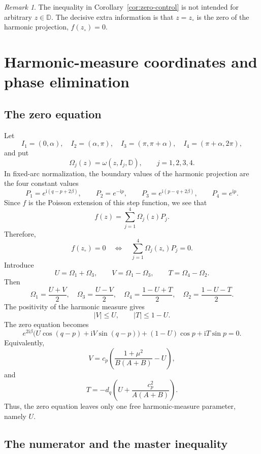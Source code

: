 \documentclass[11pt]{amsart}
\theoremstyle{remark}
\newtheorem{remark}[theorem]{Remark}
\newcommand{\D}{\mathbb D}
\newcommand{\ii}{\mathrm i}
\newcommand{\zc}{z_\circ}
\numberwithin{equation}{section}
\begin{document}
\begin{remark}
The inequality in Corollary~\ref{cor:zero-control} is not intended for arbitrary $z\in\D$.  The decisive extra information is that $z=\zc$ is the zero of the harmonic projection, $f(\zc)=0$.
\end{remark}

\section{Harmonic-measure coordinates and phase elimination}\label{sec:harmonic}

\subsection{The zero equation}

Let
\[
        I_1=(0,\alpha),\quad
        I_2=(\alpha,\pi),\quad
        I_3=(\pi,\pi+\alpha),\quad
        I_4=(\pi+\alpha,2\pi),
\]
and put
\[
        \Omega_j(z)=\omega(z,I_j,\D),
        \qquad j=1,2,3,4.
\]
In fixed-arc normalization, the boundary values of the harmonic projection are the four constant values
\[
        P_1=e^{\ii(q-p+2\beta)},
        \qquad
        P_2=e^{-\ii p},
        \qquad
        P_3=e^{\ii(p-q+2\beta)},
        \qquad
        P_4=e^{\ii p}.
\]
Since $f$ is the Poisson extension of this step function, we see that
\[
        f(z)=\sum_{j=1}^4 \Omega_j(z)P_j.
\]
Therefore,
\[
        f(\zc)=0
        \quad\Longleftrightarrow\quad
        \sum_{j=1}^4 \Omega_j(\zc)P_j=0.
\]
Introduce
\[
        U=\Omega_1+
        \Omega_3,
        \qquad
        V=\Omega_1-
        \Omega_3,
        \qquad
        T=\Omega_4-
        \Omega_2.
\]
Then
\[
        \Omega_1=\frac{U+V}{2},\quad
        \Omega_3=\frac{U-V}{2},\quad
        \Omega_4=\frac{1-U+T}{2},\quad
        \Omega_2=\frac{1-U-T}{2}.
\]
The positivity of the harmonic measure gives
\[
        |V|\leq U,
        \qquad
        |T|\leq 1-U.
\]
The zero equation becomes
\[
        e^{2\ii\beta}\bigl(U\cos(q-p)+\ii V\sin(q-p)\bigr)
        +(1-U)\cos p+
        \ii T\sin p=0.
\]
Equivalently,
\[
        V=c_p\left(\frac{1+\mu^2}{B(A+B)}-U\right),
\]
and
\[
        T=-d_q\left(U+\frac{c_p^2}{A(A+B)}\right).
\]
Thus, the zero equation leaves only one free harmonic-measure parameter, namely $U$.

\subsection{The numerator and the master inequality}
\end{document}
